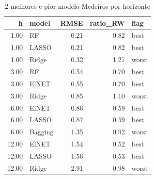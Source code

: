 \begin{table}[ht]
\centering
\begin{tabular}{rlrrl}
  \hline
h & model & RMSE & ratio\_RW & flag \\ 
  \hline
1.00 & RF & 0.21 & 0.82 & best \\ 
  1.00 & LASSO & 0.21 & 0.82 & best \\ 
  1.00 & Ridge & 0.32 & 1.27 & worst \\ 
  3.00 & RF & 0.54 & 0.70 & best \\ 
  3.00 & ElNET & 0.55 & 0.70 & best \\ 
  3.00 & Ridge & 0.85 & 1.10 & worst \\ 
  6.00 & ElNET & 0.86 & 0.59 & best \\ 
  6.00 & LASSO & 0.87 & 0.59 & best \\ 
  6.00 & Bagging & 1.35 & 0.92 & worst \\ 
  12.00 & ElNET & 1.54 & 0.52 & best \\ 
  12.00 & LASSO & 1.56 & 0.53 & best \\ 
  12.00 & Ridge & 2.91 & 0.98 & worst \\ 
   \hline
\end{tabular}
\caption{2 melhores e pior modelo Medeiros por horizonte} 
\label{tab:med_selection}
\end{table}
